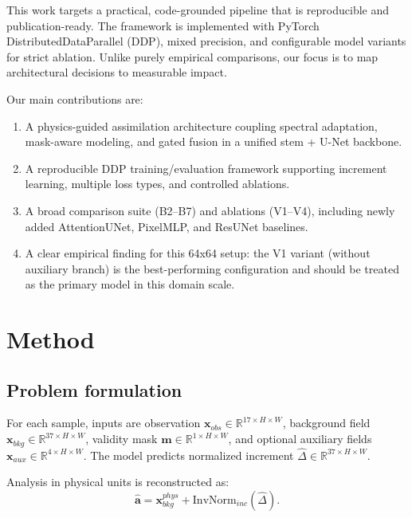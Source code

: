 \documentclass[preprint,12pt]{elsarticle}
\begin{document}
This work targets a practical, code-grounded pipeline that is reproducible and publication-ready. The framework is implemented with PyTorch DistributedDataParallel (DDP), mixed precision, and configurable model variants for strict ablation. Unlike purely empirical comparisons, our focus is to map architectural decisions to measurable impact.

Our main contributions are:
\begin{enumerate}[leftmargin=*]
\item A physics-guided assimilation architecture coupling spectral adaptation, mask-aware modeling, and gated fusion in a unified stem + U-Net backbone.
\item A reproducible DDP training/evaluation framework supporting increment learning, multiple loss types, and controlled ablations.
\item A broad comparison suite (B2--B7) and ablations (V1--V4), including newly added AttentionUNet, PixelMLP, and ResUNet baselines.
\item A clear empirical finding for this 64x64 setup: the V1 variant (without auxiliary branch) is the best-performing configuration and should be treated as the primary model in this domain scale.
\end{enumerate}

\section{Method}
\subsection{Problem formulation}
For each sample, inputs are observation $\mathbf{x}_{obs}\in\mathbb{R}^{17\times H\times W}$, background field $\mathbf{x}_{bkg}\in\mathbb{R}^{37\times H\times W}$, validity mask $\mathbf{m}\in\mathbb{R}^{1\times H\times W}$, and optional auxiliary fields $\mathbf{x}_{aux}\in\mathbb{R}^{4\times H\times W}$. The model predicts normalized increment $\hat{\Delta}\in\mathbb{R}^{37\times H\times W}$.

Analysis in physical units is reconstructed as:
\begin{equation}
\hat{\mathbf{a}} = \mathbf{x}_{bkg}^{phys} + \mathrm{InvNorm}_{inc}(\hat{\Delta}).
\end{equation}
\end{document}
